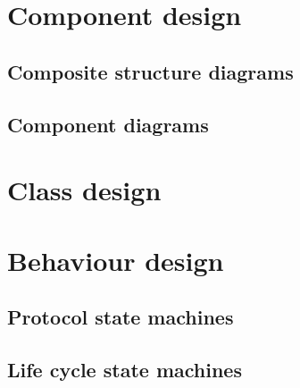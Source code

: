 \section{Component design}


\subsection{Composite structure diagrams}


\subsection{Component diagrams}





\section{Class design}



\section{Behaviour design}
\subsection{Protocol state machines}


\subsection{Life cycle state machines}
